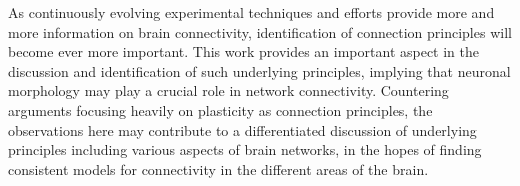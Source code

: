 As continuously evolving experimental techniques and efforts provide
more and more information on brain connectivity, identification of
connection principles will become ever more important. This work
provides an important aspect in the discussion and identification of
such underlying principles, implying that neuronal morphology may play
a crucial role in network connectivity. Countering arguments focusing
heavily on plasticity as connection principles, the observations here
may contribute to a differentiated discussion of underlying principles
including various aspects of brain networks, in the hopes of finding
consistent models for connectivity in the different areas of the
brain.



















 




